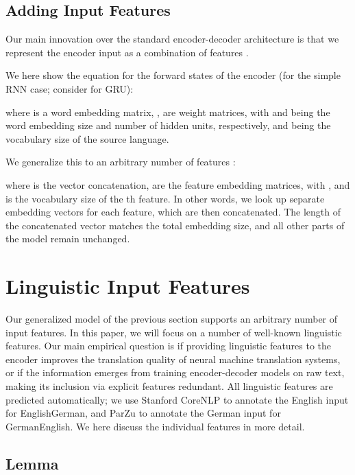 \documentclass[11pt]{article}
\begin{document}
\subsection{Adding Input Features}

Our main innovation over the standard encoder-decoder architecture is that we represent the encoder input as a combination of features \cite{alexandrescu-kirchhoff:2006:HLT-NAACL06-Short}.

We here show the equation for the forward states of the encoder (for the simple RNN case; consider \cite{DBLP:journals/corr/BahdanauCB14} for GRU):



where  is a word embedding matrix, ,  are weight matrices,
with  and  being the word embedding size and number of hidden units, respectively, and  being the vocabulary size of the source language.

We generalize this to an arbitrary number of features :



where  is the vector concatenation,
 are the feature embedding matrices, with , and  is the vocabulary size of the th feature.
In other words, we look up separate embedding vectors for each feature, which are then concatenated.
The length of the concatenated vector matches the total embedding size, and all other parts of the model remain unchanged.

\section{Linguistic Input Features}

Our generalized model of the previous section supports an arbitrary number of input features.
In this paper, we will focus on a number of well-known linguistic features.
Our main empirical question is if providing linguistic features to the encoder improves the translation quality of neural machine translation systems, or if the information emerges from training encoder-decoder models on raw text, making its inclusion via explicit features redundant.
All linguistic features are predicted automatically;
we use Stanford CoreNLP \cite{N03-1033,DBLP:journals/nle/MinnenCP01,chen-manning:2014:EMNLP2014} to annotate the English input for EnglishGerman, and ParZu \cite{sennrich13c} to annotate the German input for GermanEnglish.
We here discuss the individual features in more detail.

\subsection{Lemma}
\end{document}
